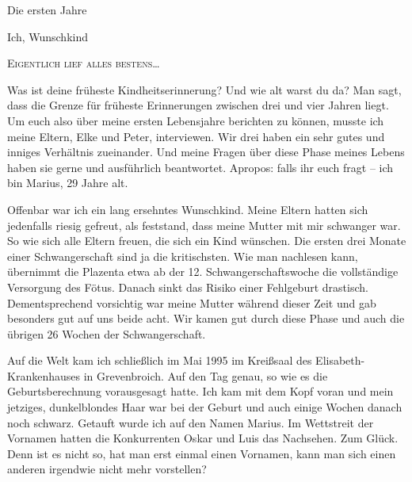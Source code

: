 \documentclass[fontsize=14pt,a4paper,headinclude,DIV=calc,automark]{scrbook}
\begin{document}

\mainmatter

\clearpairofpagestyles %
\rehead{\leftmark}     %
\lehead{\thepage}      %
\rohead{\thepage}      %
\lohead{\leftmark}     %

\pagestyle{scrheadings}

\begin{chapterbox}
    Die ersten Jahre
\end{chapterbox}
\thispagestyle{scrheadings} %
\leavevmode
{\noindent\fontsize{18}{24}\selectfont\textcolor{myblue}{Ich, Wunschkind}\par}
{\noindent\fontsize{14}{20}\selectfont\scshape\textcolor{myblue}{Eigentlich lief alles bestens}\ldots\par}
\vspace*{0.5\baselineskip}
\normalsize

Was ist deine früheste Kindheitserinnerung? Und wie alt warst du da? Man sagt, dass die Grenze für früheste Erinnerungen zwischen drei und vier Jahren liegt. Um euch also über meine ersten Lebensjahre berichten zu können, musste ich meine Eltern, Elke und Peter, interviewen. Wir drei haben ein sehr gutes und inniges Verhältnis zueinander. Und meine Fragen über diese Phase meines Lebens haben sie gerne und ausführlich beantwortet. Apropos: falls ihr euch fragt – ich bin Marius, 29 Jahre alt.

Offenbar war ich ein lang ersehntes Wunschkind. Meine Eltern hatten sich jedenfalls riesig gefreut, als feststand, dass meine Mutter mit mir schwanger war. So wie sich alle Eltern freuen, die sich ein Kind wünschen. Die ersten drei Monate einer Schwangerschaft sind ja die kritischsten. Wie man nachlesen kann, übernimmt die Plazenta etwa ab der 12. Schwangerschaftswoche die vollständige Versorgung des Fötus. Danach sinkt das Risiko einer Fehlgeburt drastisch. Dementsprechend vorsichtig war meine Mutter während dieser Zeit und gab besonders gut auf uns beide acht. Wir kamen gut durch diese Phase und auch die übrigen 26 Wochen der Schwangerschaft.

Auf die Welt kam ich schließlich im Mai 1995 im Kreißsaal des Elisabeth-Kran\-ken\-hau\-ses in Grevenbroich. Auf den Tag genau, so wie es die Geburtsberechnung vorausgesagt hatte. Ich kam mit dem Kopf voran und mein jetziges, dunkelblondes Haar war bei der Geburt und auch einige Wochen danach noch schwarz. Getauft wurde ich auf den Namen Marius. Im Wettstreit der Vornamen hatten die Konkurrenten Oskar und Luis das Nachsehen. Zum Glück. Denn ist es nicht so, hat man erst einmal einen Vornamen, kann man sich einen anderen irgendwie nicht mehr vorstellen?
\end{document}
